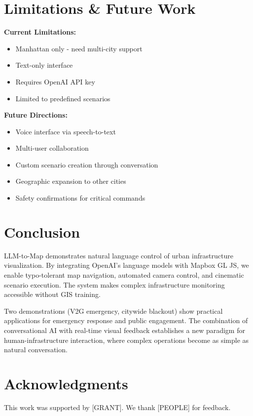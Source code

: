 \documentclass[sigconf]{acmart}
\begin{document}
\section{Limitations \& Future Work}

\textbf{Current Limitations:}
\begin{itemize}
    \item Manhattan only - need multi-city support
    \item Text-only interface
    \item Requires OpenAI API key
    \item Limited to predefined scenarios
\end{itemize}

\textbf{Future Directions:}
\begin{itemize}
    \item Voice interface via speech-to-text
    \item Multi-user collaboration
    \item Custom scenario creation through conversation
    \item Geographic expansion to other cities
    \item Safety confirmations for critical commands
\end{itemize}

\section{Conclusion}

LLM-to-Map demonstrates natural language control of urban infrastructure visualization. By integrating OpenAI's language models with Mapbox GL JS, we enable typo-tolerant map navigation, automated camera control, and cinematic scenario execution. The system makes complex infrastructure monitoring accessible without GIS training.

Two demonstrations (V2G emergency, citywide blackout) show practical applications for emergency response and public engagement. The combination of conversational AI with real-time visual feedback establishes a new paradigm for human-infrastructure interaction, where complex operations become as simple as natural conversation.

\section*{Acknowledgments}
This work was supported by [GRANT]. We thank [PEOPLE] for feedback.
\end{document}
